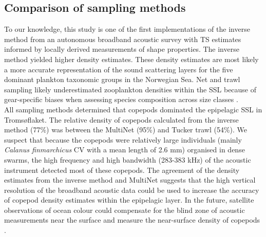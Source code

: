 \subsection{Comparison of sampling methods}
To our knowledge, this study is one of the first implementations of the inverse method from an autonomous broadband acoustic survey with TS estimates informed by locally derived measurements of shape properties. The inverse method yielded higher density estimates. These density estimates are most likely a more accurate representation of the sound scattering layers for the five dominant plankton taxonomic groups in the Norwegian Sea. Net and trawl sampling likely underestimated zooplankton densities within the SSL because of gear-specific biases when assessing species composition across size classes \citep{Skjoldal2013, Hetherington2022}.\\
All sampling methods determined that copepods dominated the epipelagic SSL in Tromsøflaket. The relative density of copepods calculated from the inverse method (77\%) was between the MultiNet (95\%) and Tucker trawl (54\%). We suspect that because the copepods were relatively large individuals (mainly \textit{Calanus finmarchicus} CV with a mean length of 2.6 mm) organised in dense swarms, the high frequency and high bandwidth (283-383 kHz) of the acoustic instrument detected most of these copepods. The agreement of the density estimates from the inverse method and MultiNet suggests that the high vertical resolution of the broadband acoustic data could be used to increase the accuracy of copepod density estimates within the epipelagic layer. In the future, satellite observations of ocean colour could compensate for the blind zone of acoustic measurements near the surface and measure the near-surface density of copepods \citep{Basedow2019}.\\
